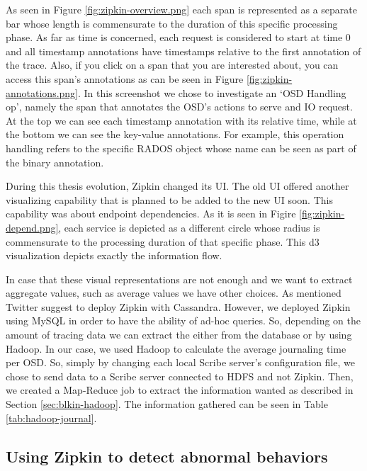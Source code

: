 As seen in Figure \ref{fig:zipkin-overview.png} each span is represented as a
separate bar whose length is commensurate to the duration of this specific
processing phase. As far as time is concerned, each request is considered to
start at time 0 and all timestamp annotations have timestamps relative to the
first annotation of the trace. Also, if you click on a span that you are
interested about, you can access this span's annotations as can be seen in
Figure \ref{fig:zipkin-annotations.png}. In this screenshot we chose to
investigate an `OSD Handling op', namely the span that annotates the OSD's
actions to serve and IO request. At the top we can see each timestamp annotation
with its relative time, while at the bottom we can see the key-value
annotations. For example, this operation handling refers to the specific RADOS
object whose name can be seen as part of the binary annotation.


During this thesis evolution, Zipkin changed its UI. The old UI offered another
visualizing capability that is planned to be added to the new UI soon. This
capability was about endpoint dependencies. As it is seen in Figire
\ref{fig:zipkin-depend.png}, each service is depicted as a different circle
whose radius is commensurate to the processing duration of that specific phase.
This d3 visualization depicts exactly the information flow.


In case that these visual representations are not enough and we want to extract
aggregate values, such as average values we have other choices. As mentioned
Twitter suggest to deploy Zipkin with Cassandra. However, we deployed Zipkin
using MySQL in order to have the ability of ad-hoc queries. So, depending on the
amount of tracing data we can extract the either from the database or by using
Hadoop. In our case, we used Hadoop to calculate the average journaling time per
OSD. So, simply by changing each local Scribe server's configuration file, we
chose to send data to a Scribe server connected to HDFS and not Zipkin. Then, we
created a Map-Reduce job to extract the information wanted as described in
Section \ref{sec:blkin-hadoop}. The information gathered can be seen in Table
\ref{tab:hadoop-journal}.

\subsection{Using Zipkin to detect abnormal behaviors}

